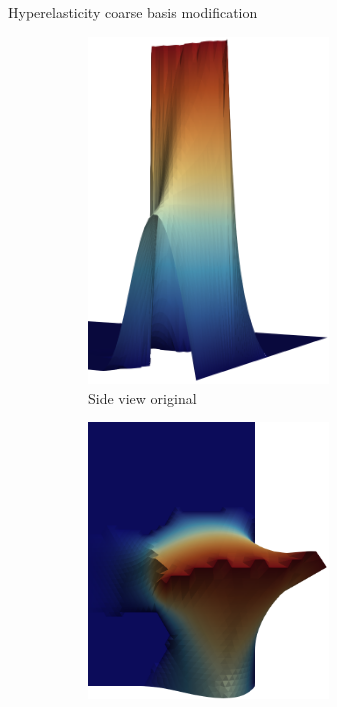 \begin{frame}{Hyperelasticity coarse basis modification}
	\begin{figure}[h!]
		\begin{subfigure}{0.49\textwidth}
			\centering
			\includegraphics[width=0.7\textwidth,height=0.33\textheight]{images/beam-coarse-basis-1.png}
			\caption{\hspace{-20mm}Side view original}
		\end{subfigure}
		\hfill
		\begin{subfigure}{0.49\textwidth}
			\centering
			\includegraphics[width=0.7\textwidth,height=0.33\textheight]{images/beam-coarse-basis-2.png}

\end{subfigure}
\end{figure}
\end{frame}
